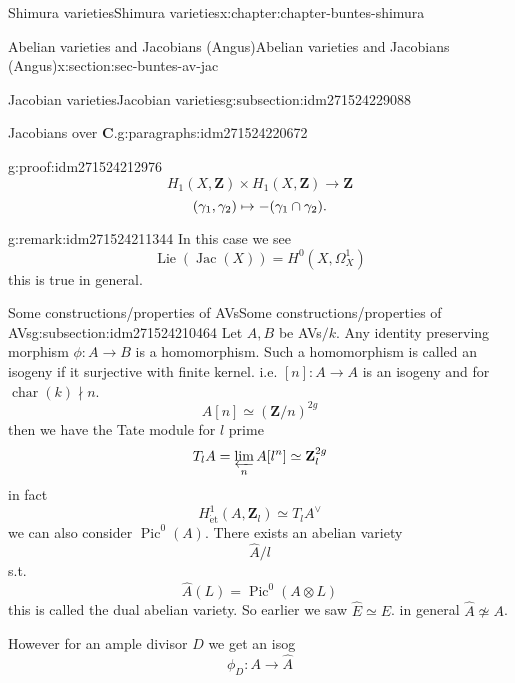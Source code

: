 \documentclass[oneside,10pt,]{book}
\newcommand{\qedhere}{\relax}
\numberwithin{equation}{section}
\DeclareMathOperator{\Lie}{Lie}
\newcommand{\lb}{[}
\newcommand{\rb}{]}
\newcommand{\ZZ}{\mathbf{Z}}
\newcommand{\CC}{\mathbf{C}}
\newcommand{\et}{\mathrm{\acute{e}t}}
\DeclareMathOperator{\Pic}{Pic}
\DeclareMathOperator{\Jac}{Jac}
\DeclareMathOperator{\characteristic}{char}
\begin{document}
\begin{chapterptx}{Shimura varieties}{}{Shimura varieties}{}{}{x:chapter:chapter-buntes-shimura}
\begin{sectionptx}{Abelian varieties and Jacobians (Angus)}{}{Abelian varieties and Jacobians (Angus)}{}{}{x:section:sec-buntes-av-jac}
\begin{subsectionptx}{Jacobian varieties}{}{Jacobian varieties}{}{}{g:subsection:idm271524229088}
\begin{paragraphs}{Jacobians over \(\CC\).}{g:paragraphs:idm271524220672}
\begin{proofptx}{}{g:proof:idm271524212976}
\begin{equation*}
H_1(X, \ZZ) \times H_1(X, \ZZ) \to \ZZ
\end{equation*}
%
\begin{equation*}
(\gamma_1, \gamma_2) \mapsto -(\gamma_1\cap \gamma_2)\text{.}\qedhere
\end{equation*}
%
\end{proofptx}
\begin{remark}{}{g:remark:idm271524211344}%
In this case we see%
\begin{equation*}
\Lie(\Jac(X)) = H^0(X, \Omega_X^1)
\end{equation*}
this is true in general.%
\end{remark}
\end{paragraphs}%
\end{subsectionptx}
%
%
\typeout{************************************************}
\typeout{************************************************}
%
\begin{subsectionptx}{Some constructions\slash{}properties of AVs}{}{Some constructions\slash{}properties of AVs}{}{}{g:subsection:idm271524210464}
Let \(A,B\) be AVs\(/k\). Any identity preserving morphism \(\phi \colon A \to B\) is a homomorphism. Such a homomorphism is called an isogeny if it surjective with finite kernel. i.e. \(\lb n \rb \colon A \to A\) is an isogeny and for \(\characteristic(k) \nmid n\).%
\begin{equation*}
A[n] \simeq (\ZZ/n)^{2g}
\end{equation*}
then we have the Tate module for \(l\) prime%
\begin{equation*}
T_lA = \varprojlim_n A[l^n] \simeq \ZZ_l^{2g}
\end{equation*}
in fact%
\begin{equation*}
H^1_{\et} (A, \ZZ_l) \simeq T_lA ^\vee
\end{equation*}
we can also consider \(\Pic^0(A)\). There exists an abelian variety%
\begin{equation*}
\hat A/l
\end{equation*}
s.t.%
\begin{equation*}
\hat A (L) = \Pic^0(A \otimes L)
\end{equation*}
this is called the dual abelian variety. So earlier we saw \(\hat E \simeq E\). in general \(\hat A \not \simeq  A\).%
\par
However for an ample divisor \(D\) we get an isog%
\begin{equation*}
\phi_D \colon A \to \hat A
\end{equation*}

\end{subsectionptx}
\end{sectionptx}
\end{chapterptx}
\end{document}
